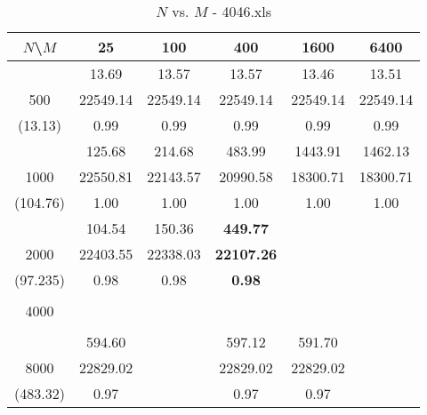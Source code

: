 \documentclass[conference]{IEEEtran}
\begin{document}
\begin{table}[th]
\caption{$N$ vs. $M$ - 4046.xls}
\label{tab:4046.xls}
\centering
\begin{tabular}{|c||c|c|c|c|c|}
\hline
$N$\textbackslash $M$ & 25 & 100 & 400 & 1600 & 6400 \\ \hline \hline
  & 13.69 & 13.57 & 13.57 & 13.46 & 13.51\\ 
500  & 22549.14 & 22549.14 & 22549.14 & 22549.14 & 22549.14\\ 
(13.13)  & 0.99 & 0.99 & 0.99 & 0.99 & 0.99\\ \hline 
  & 125.68 & 214.68 & 483.99 & 1443.91 & 1462.13\\ 
1000  & 22550.81 & 22143.57 & 20990.58 & 18300.71 & 18300.71\\ 
(104.76)  & 1.00 & 1.00 & 1.00 & 1.00 & 1.00\\ \hline 
  & 104.54 & 150.36 & {\bf 449.77} &  & \\ 
2000  & 22403.55 & 22338.03 & {\bf 22107.26} &  & \\ 
(97.235)  & 0.98 & 0.98 & {\bf 0.98} &  & \\ \hline 
  &  &  &  &  & \\ 
4000  &  &  &  &  & \\ 
  &  &  &  &  & \\ \hline 
  & 594.60 &  & 597.12 & 591.70 & \\ 
8000  & 22829.02 &  & 22829.02 & 22829.02 & \\ 
(483.32)  & 0.97 &  & 0.97 & 0.97 & \\ \hline 
\end{tabular}
\end{table}
\end{document}
